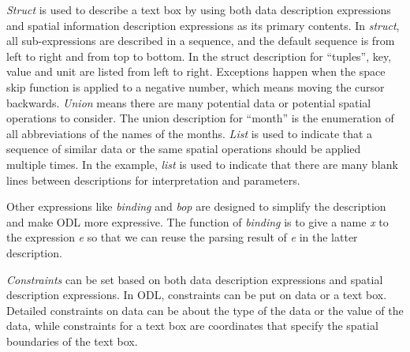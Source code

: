 \textit{Struct} is used to describe a text box by using both data description
expressions and spatial information description expressions as its primary contents.
In \textit{struct}, all sub-expressions are described in a sequence,
and the default sequence is from left to right and from top to bottom. In the struct description for ``tuples'', key, value and unit are listed from left to right.
Exceptions happen when the space skip function is applied to a negative number, which means moving the cursor backwards.
\textit{Union} means there are many potential data or potential spatial operations to consider. The union description for ``month'' is the enumeration of all abbreviations of the names of the months.
\textit{List} is used to indicate that a sequence of similar data or the same spatial operations should be applied multiple times. In the example, \textit{list} is used to indicate that there are many blank lines between descriptions for interpretation and parameters.

Other expressions like \textit{binding} and \textit{bop} are designed to
simplify the description and make ODL more expressive.
The function of \textit{binding} is to give a name \textit{x} to
the expression \textit{e} so that we can reuse the parsing result of \textit{e}
in the latter description.

\textit{Constraints} can
be set based on both data description expressions and
spatial description expressions. In ODL, constraints can be put on
data or a text box.
Detailed constraints on data can be about the
type of the data or the value of the data, while constraints for a
text box are coordinates that specify the spatial boundaries of the text box.



